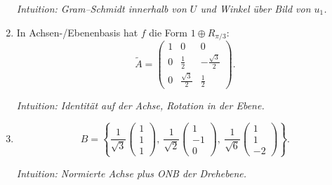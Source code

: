 \documentclass[11pt, a4paper]{article}
\begin{document}
\begin{enumerate}
  \medskip\noindent\textit{Intuition: Gram–Schmidt innerhalb von $U$ und Winkel über Bild von $u_1$.}

  \item
  In Achsen-/Ebenenbasis hat $f$ die Form $1\oplus R_{\pi/3}$:
  \[
  \tilde A=
  \begin{pmatrix}
  1&0&0\\
  0&\tfrac12&-\tfrac{\sqrt3}{2}\\
  0&\tfrac{\sqrt3}{2}&\tfrac12
  \end{pmatrix}.
  \]

  \medskip\noindent\textit{Intuition: Identität auf der Achse, Rotation in der Ebene.}

  \item
  \[
  B=\left\{
  \frac{1}{\sqrt3}\begin{pmatrix}1\\1\\1\end{pmatrix},\
  \frac{1}{\sqrt2}\begin{pmatrix}1\\-1\\0\end{pmatrix},\
  \frac{1}{\sqrt6}\begin{pmatrix}1\\1\\-2\end{pmatrix}
  \right\}.
  \]

  \medskip\noindent\textit{Intuition: Normierte Achse plus ONB der Drehebene.}
\end{enumerate}
\end{document}
